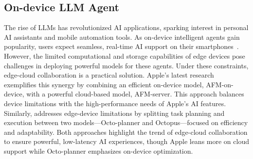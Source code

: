
\subsection{On-device LLM Agent}
The rise of LLMs has revolutionized AI applications, sparking interest in personal AI assistants and mobile automation tools. As on-device intelligent agents gain popularity, users expect seamless, real-time AI support on their smartphones~\cite{gong2024population}. However, the limited computational and storage capabilities of edge devices pose challenges in deploying powerful models for these agents. Under these constraints, edge-cloud collaboration is a practical solution.
Apple's latest research~\cite{gunter2024apple} exemplifies this synergy by combining an efficient on-device model, AFM-on-device, with a powerful cloud-based model, AFM-server. This approach balances device limitations with the high-performance needs of Apple’s AI features. Similarly, \cite{chen2024octo} addresses edge-device limitations by splitting task planning and execution between two models—Octo-planner and Octopus—focused on efficiency and adaptability. Both approaches highlight the trend of edge-cloud collaboration to ensure powerful, low-latency AI experiences, though Apple leans more on cloud support while Octo-planner emphasizes on-device optimization.

